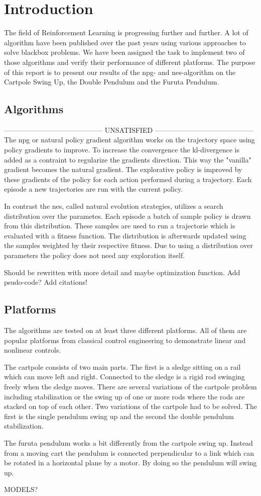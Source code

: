 \section{Introduction}
\label{intro}
The field of Reinforcement Learning is progressing further and further. A lot of algorithm have been published over the past years using various approaches to solve blackbox problems. We have been assigned the task to implement two of those algorithms and verify their performance of different platforms. The purpose of this report is to present our results of the npg- and nes-algorithm on the Cartpole Swing Up, the Double Pendulum and the Furuta Pendulum.

\subsection{Algorithms}
\label{algos}
------------------------------------------ UNSATISFIED ------------------------------------------
The npg or natural policy gradient algorithm works on the trajectory space using policy gradients to improve. To increase the convergence the kl-divergence is added as a contraint to regularize the gradients direction. This way the "vanilla" gradient becomes the natural gradient. The explorative policy is improved by these gradients of the policy for each action performed during a trajectory. Each episode a new trajectories are run with the current policy.

In contrast the nes, called natural evolution strategies, utilizes a search distribution over the parametes. Each episode a batch of sample policy is drawn from this distribution. These samples are used to run a trajectorie which is evaluated with a fitness function. The distribution is afterwards updated using the samples weighted by their respective fitness. Due to using a distribution over parameters the policy does not need any exploration itself.

Should be rewritten with more detail and maybe optimization function. Add psudo-code? Add citations!

\subsection{Platforms}
\label{plats}
The algorithms are tested on at least three different platforms. All of them are popular platforms from classical control engineering to demonstrate linear and nonlinear controls.

The cartpole consists of two main parts. The first is a sledge sitting on a rail which can move left and right. Connected to the sledge is a rigid rod swinging freely when the sledge moves. There are several variations of the cartpole problem including stabilization or the swing up of one or more rods where the rods are stacked on top of each other. Two variations of the cartpole had to be solved. The first is the single pendulum swing up and the second the double pendulum stabilization.

The furuta pendulum works a bit differently from the cartpole swing up. Instead from a moving cart the pendulum is connected perpendicular to a link which can be rotated in a horizontal plane by a motor. By doing so the pendulum will swing up.

MODELS?
